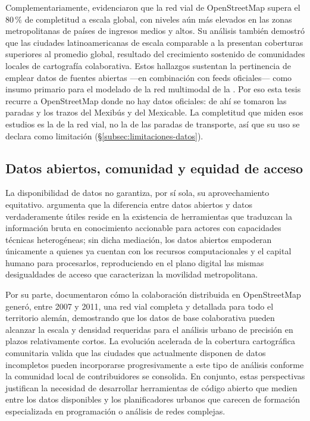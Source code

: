 Complementariamente, \citet{barrington2017world} evidenciaron que la red vial de
OpenStreetMap supera el 80\,\% de completitud a escala global, con niveles aún más
elevados en las zonas metropolitanas de países de ingresos medios y altos. Su
análisis también demostró que las ciudades latinoamericanas de escala comparable
a la \zmvm{} presentan coberturas superiores al promedio global, resultado del
crecimiento sostenido de comunidades locales de cartografía colaborativa. Estos
hallazgos sustentan la pertinencia de emplear datos \gis{} de fuentes abiertas
---en combinación con feeds \gtfs{} oficiales--- como insumo primario para el
modelado de la red multimodal de la \zmvm{}. Por eso esta tesis recurre a
OpenStreetMap donde no hay datos oficiales: de ahí se tomaron las paradas y los
trazos del Mexibús y del Mexicable. La completitud que miden esos estudios es la
de la red vial, no la de las paradas de transporte, así que su uso se declara
como limitación (§\ref{subsec:limitaciones-datos}).

\subsection{Datos abiertos, comunidad y equidad de acceso}
\label{subsec:datos-comunidad-equidad}

La disponibilidad de datos no garantiza, por sí sola, su aprovechamiento
equitativo. \citet{gurstein2011open} argumenta que la diferencia entre datos
abiertos y datos verdaderamente útiles reside en la existencia de herramientas
que traduzcan la información bruta en conocimiento accionable para actores con
capacidades técnicas heterogéneas; sin dicha mediación, los datos abiertos
empoderan únicamente a quienes ya cuentan con los recursos computacionales y el
capital humano para procesarlos, reproduciendo en el plano digital las mismas
desigualdades de acceso que caracterizan la movilidad metropolitana.

Por su parte, \citet{neis2012street} documentaron cómo la colaboración
distribuida en OpenStreetMap generó, entre 2007 y 2011, una red vial completa y
detallada para todo el territorio alemán, demostrando que los datos \gis{} de
base colaborativa pueden alcanzar la escala y densidad requeridas para el
análisis urbano de precisión en plazos relativamente cortos. La evolución
acelerada de la cobertura cartográfica comunitaria valida que las ciudades que
actualmente disponen de datos incompletos pueden incorporarse progresivamente a
este tipo de análisis conforme la comunidad local de contribuidores se
consolida. En conjunto, estas perspectivas justifican la necesidad de
desarrollar herramientas de código abierto que medien entre los datos
disponibles y los planificadores urbanos que carecen de formación especializada
en programación o análisis de redes complejas.

